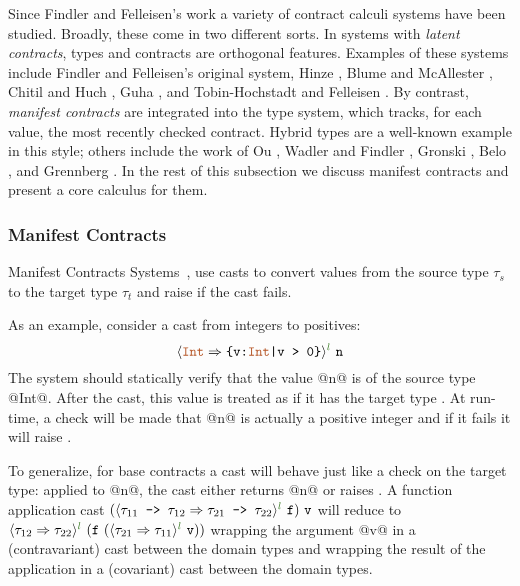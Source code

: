 Since Findler and Felleisen's work 
a variety of contract calculi systems have been studied. 
Broadly, these come in two different sorts. 
%
In systems with \textit{latent contracts}, types and contracts
are orthogonal features. Examples of these systems include Findler
and Felleisen's original system, Hinze \etal \cite{Hinze06}, Blume and
McAllester \cite{BlumeM06}, Chitil and Huch \cite{ChitilH07}, Guha \etal \cite{GuhaMFK07},
and Tobin-Hochstadt and Felleisen \cite{Tobin-HochstadtF08}. 
By contrast, \textit{manifest contracts} are integrated into the type system, 
which tracks, for each value, the most recently checked contract. 
Hybrid types \cite{flanagan06} are a well-known example in this style; others include the
work of Ou \etal \cite{Ou2004}, Wadler and Findler \cite{WadlerF09}, Gronski
\etal \cite{Gronski06}, Belo \etal \cite{Greenberg11}, and Grennberg \etal \cite{Greenberg12}.
%
In the rest of this subsection we discuss manifest contracts and
present a core calculus for them.

\subsubsection{Manifest Contracts}

Manifest Contracts Systems~\cite{Greenberg12}, use casts
to convert values from the source type $\tau_s$ 
to the target type $\tau_t$ and raise 
if the cast fails.

As an example, consider a cast from integers to positives:
$$
\ecast{\tyint}{\ttpos}{l} \ \texttt{n}
$$
The system should statically verify that the value @n@ is 
of the source type @Int@.
After the cast, this value is treated as
if it has the target type \ttpos.
At run-time, a check will be made that @n@ 
is actually a positive integer and if it fails it will raise .

To generalize, for base contracts a cast will behave just like a check on the target type: 
applied to @n@, the cast either returns @n@ or raises  . 
%
A function application cast 
$(\ecast{\tau_{11} \texttt{ -> } \tau_{12}}{\tau_{21} \texttt{ -> } \tau_{22}}{l} \ \texttt{f} ) \ \texttt{v}$
will reduce to 
$\ecast{\tau_{12}}{\tau_{22}}{l}\ (
	\texttt{f} \ 
	(
		\ecast{\tau_{21}}{\tau_{11}}{l} 
		\ \texttt{v}
	)
)$
wrapping the argument @v@ in a (contravariant) cast between the domain types
and wrapping the result of the application in a (covariant) cast between the
domain types.

